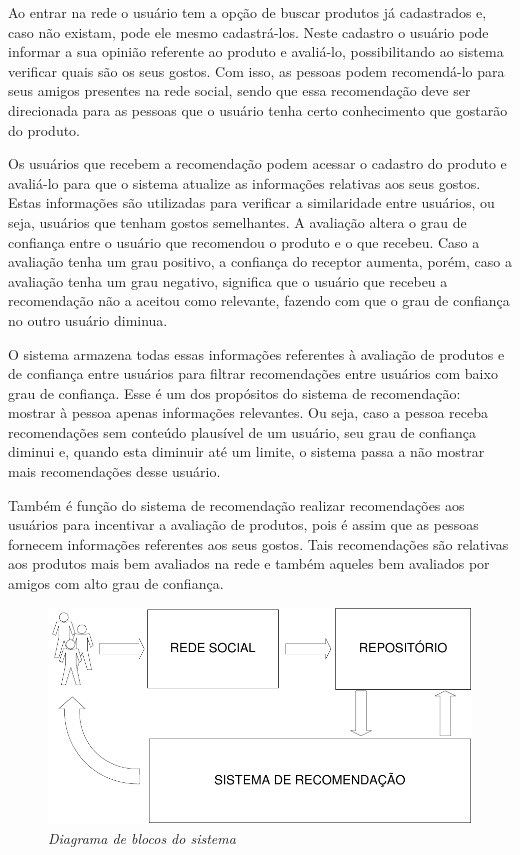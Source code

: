  Ao entrar na rede o usuário tem a opção de buscar produtos já cadastrados e, caso não existam, pode ele mesmo cadastrá-los. Neste cadastro o usuário pode informar a sua opinião referente ao produto e avaliá-lo, possibilitando ao sistema verificar quais são os seus gostos. Com isso, as pessoas podem recomendá-lo para seus amigos presentes na rede social, sendo que essa recomendação deve ser direcionada para as pessoas que o usuário tenha certo conhecimento que gostarão do produto.

 Os usuários que recebem a recomendação podem acessar o cadastro do produto e avaliá-lo para que o sistema atualize as informações relativas aos seus gostos. Estas informações são utilizadas para verificar a similaridade entre usuários, ou seja, usuários que tenham gostos semelhantes. A avaliação altera o grau de confiança entre o usuário que recomendou o produto e o que recebeu. Caso a avaliação tenha um grau positivo, a confiança do receptor aumenta, porém, caso a avaliação tenha um grau negativo, significa que o usuário que recebeu a recomendação não a aceitou como relevante, fazendo com que o grau de confiança no outro usuário diminua.

 O sistema armazena todas essas informações referentes à avaliação de produtos e de confiança entre usuários para filtrar recomendações entre usuários com baixo grau de confiança. Esse é um dos propósitos do sistema de recomendação: mostrar à pessoa apenas informações relevantes. Ou seja, caso a pessoa receba recomendações sem conteúdo plausível de um usuário, seu grau de confiança diminui e, quando esta diminuir até um limite, o sistema passa a não mostrar mais recomendações desse usuário.

 Também é função do sistema de recomendação realizar recomendações aos usuários para incentivar a avaliação de produtos, pois é assim que as pessoas fornecem informações referentes aos seus gostos. Tais recomendações são relativas aos produtos mais bem avaliados na rede e também aqueles bem avaliados por amigos com alto grau de confiança.

\begin{figure}
  \centering
  \includegraphics[width=\textwidth]{imagens/Diagrama_Visao_Geral}
  \caption{\it Diagrama de blocos do sistema}
  \label{fig:escopo}
\end{figure}


